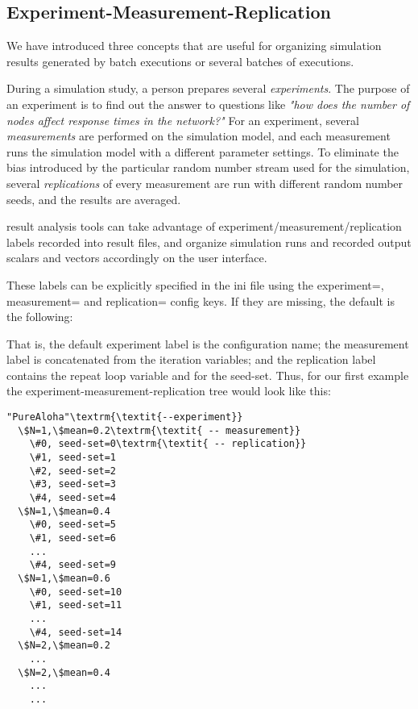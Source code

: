 \subsection{Experiment-Measurement-Replication}

We have introduced three concepts that are useful for organizing
simulation results generated by batch executions or several batches of
executions.

During a simulation study, a person prepares several
\textit{experiments}. The purpose of an experiment is to find out the
answer to questions like \textit{"how does the number of
nodes affect response times in the network?"} For an
experiment, several \textit{measurements} are performed on the
simulation model, and each measurement runs the simulation model with a
different parameter settings. To eliminate the bias introduced by the
particular random number stream used for the simulation, several
\textit{replications} of every measurement are run with different
random number seeds, and the results are averaged.

{\opp} result analysis tools can take advantage of
experiment/measurement/replication labels recorded into result files,
and organize simulation runs and recorded output scalars and vectors
accordingly on the user interface.

These labels can be explicitly specified in the ini file using the
experiment=, measurement= and replication= config keys. If they are
missing, the default is the following:



That is, the default experiment label is the configuration name; the
measurement label is concatenated from the iteration variables; and the
replication label contains the repeat loop variable and for the
seed-set. Thus, for our first example the
experiment-measurement-replication tree would look like this:

\begin{Verbatim}[commandchars=\\\{\}]
"PureAloha"\textrm{\textit{--experiment}}
  \$N=1,\$mean=0.2\textrm{\textit{ -- measurement}}
    \#0, seed-set=0\textrm{\textit{ -- replication}}
    \#1, seed-set=1
    \#2, seed-set=2
    \#3, seed-set=3
    \#4, seed-set=4
  \$N=1,\$mean=0.4
    \#0, seed-set=5
    \#1, seed-set=6
    ...
    \#4, seed-set=9
  \$N=1,\$mean=0.6
    \#0, seed-set=10
    \#1, seed-set=11
    ...
    \#4, seed-set=14
  \$N=2,\$mean=0.2
    ...
  \$N=2,\$mean=0.4
    ...
    ...
\end{Verbatim}

